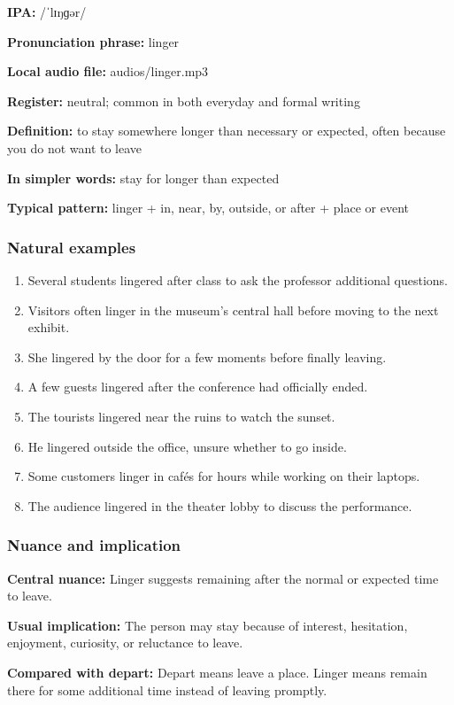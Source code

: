 \documentclass[11pt]{article}
\begin{document}
\textbf{IPA:} /ˈlɪŋɡər/

\textbf{Pronunciation phrase:} linger

\textbf{Local audio file:} audios/linger.mp3

\textbf{Register:} neutral; common in both everyday and formal writing

\textbf{Definition:} to stay somewhere longer than necessary or expected, often because you do not want to leave

\textbf{In simpler words:} stay for longer than expected

\textbf{Typical pattern:} linger + in, near, by, outside, or after + place or event

\subsubsection{Natural examples}
\begin{enumerate}
  \item Several students lingered after class to ask the professor additional questions.
  \item Visitors often linger in the museum's central hall before moving to the next exhibit.
  \item She lingered by the door for a few moments before finally leaving.
  \item A few guests lingered after the conference had officially ended.
  \item The tourists lingered near the ruins to watch the sunset.
  \item He lingered outside the office, unsure whether to go inside.
  \item Some customers linger in cafés for hours while working on their laptops.
  \item The audience lingered in the theater lobby to discuss the performance.
\end{enumerate}

\subsubsection{Nuance and implication}
\textbf{Central nuance:} Linger suggests remaining after the normal or expected time to leave.

\textbf{Usual implication:} The person may stay because of interest, hesitation, enjoyment, curiosity, or reluctance to leave.

\textbf{Compared with depart:} Depart means leave a place. Linger means remain there for some additional time instead of leaving promptly.
\end{document}

